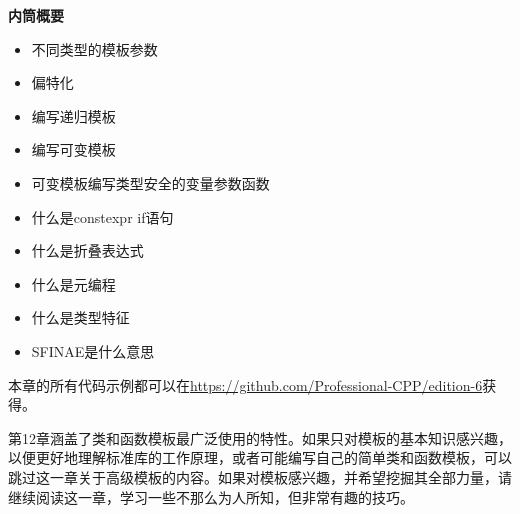\noindent
\textbf{内筒概要}

\begin{itemize}
\item
不同类型的模板参数

\item
偏特化

\item
编写递归模板

\item
编写可变模板

\item
可变模板编写类型安全的变量参数函数

\item
什么是constexpr if语句

\item
什么是折叠表达式

\item
什么是元编程

\item
什么是类型特征

\item
SFINAE是什么意思
\end{itemize}

本章的所有代码示例都可以在\url{https://github.com/Professional-CPP/edition-6}获得。

第12章涵盖了类和函数模板最广泛使用的特性。如果只对模板的基本知识感兴趣，以便更好地理解标准库的工作原理，或者可能编写自己的简单类和函数模板，可以跳过这一章关于高级模板的内容。如果对模板感兴趣，并希望挖掘其全部力量，请继续阅读这一章，学习一些不那么为人所知，但非常有趣的技巧。



















